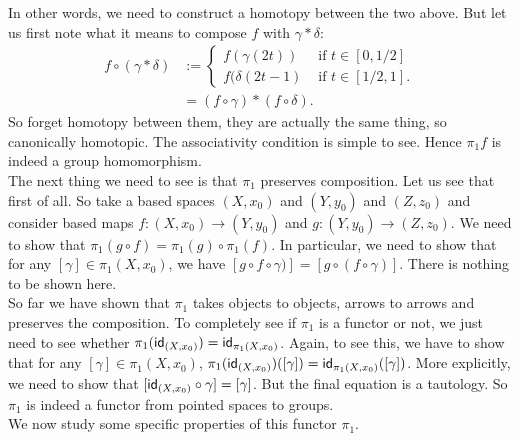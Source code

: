 \documentclass[letterpaper,11pt,twoside]{article}
\theoremstyle{definition}
\theoremstyle{definition}
\theoremstyle{definition}
\theoremstyle{definition}
\theoremstyle{definition}
\theoremstyle{definition}
\theoremstyle{remark}
\theoremstyle{definition}
\newcommand{\id}[1]{{\fontfamily{lmss}\selectfont 
		\text{id}_{#1}
}}
\begin{document}
In other words, we need to construct a homotopy between the two above. But let us first note what it means to compose $f$ with $\gamma * \delta$:
\begin{align*}
    f\circ (\gamma *\delta) &:= \begin{cases}
        f(\gamma(2t))&\text{ if } t\in [0,1/2]\\
        f(\delta(2t-1)&\text{ if }t\in [1/2,1].
    \end{cases}\\
    &=(f\circ \gamma)* (f\circ \delta).
\end{align*}
So forget homotopy between them, they are actually the same thing, so canonically homotopic. The associativity condition is simple to see. Hence $\pi_1f$ is indeed a group homomorphism.\\

The next thing we need to see is that $\pi_1$ preserves composition. Let us see that first of all. So take a based spaces $(X,x_0)$ and $(Y,y_0)$ and $(Z,z_0)$ and consider based maps $f : (X,x_0) \to (Y,y_0) $ and $g : (Y,y_0) \to (Z,z_0)$. We need to show that $\pi_1(g\circ f) = \pi_1(g) \circ \pi_1(f) $. In particular, we need to show that for any $[\gamma] \in \pi_1(X,x_0)$, we have $[g\circ f\circ \gamma)] = [g\circ (f\circ \gamma)]$. There is nothing to be shown here. \\

So far we have shown that $\pi_1$ takes objects to objects, arrows to arrows and preserves the composition. To completely see if $\pi_1$ is a functor or not, we just need to see whether $\pi_{1}(\id{(X,x_0)}) = \id{\pi_1(X,x_0)}$. Again, to see this, we have to show that for any $[\gamma] \in \pi_1(X,x_0)$, $\pi_1(\id{(X,x_0)}) ([\gamma]) = \id{\pi_1(X,x_0)}([\gamma])$. More explicitly, we need to show that $[\id{(X,x_0)} \circ \gamma ]  = [\gamma]$. But the final equation is a tautology. So $\pi_1$ is indeed a functor from pointed spaces to groups.\\

We now study some specific properties of this functor $\pi_1$.
\end{document}
